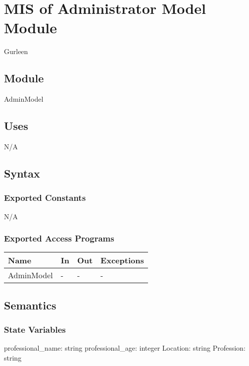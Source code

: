 \documentclass[12pt, titlepage]{article}
\begin{document}
\newpage

\section{MIS of Administrator Model Module } \label{Admin_Model_Module} Gurleen

\subsection{Module}

AdminModel

\subsection{Uses}

N/A

\subsection{Syntax}

\subsubsection{Exported Constants}

N/A

\subsubsection{Exported Access Programs}

\begin{center}
\begin{tabular}{p{3cm} p{4cm} p{4cm} p{3.5cm}}
\hline
\textbf{Name} & \textbf{In} & \textbf{Out} & \textbf{Exceptions} \\
\hline
AdminModel & - & - & - & \\ 
\hline
\end{tabular}
\end{center}

\subsection{Semantics}

\subsubsection{State Variables}

professional_name: string
professional_age: integer
Location: string
Profession: string
\end{document}
